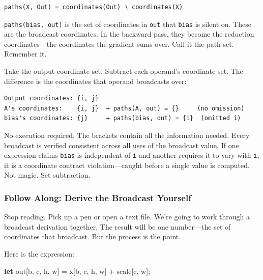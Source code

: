 \documentclass[11pt,titlepage]{article}
\newenvironment{Shaded}{}{}
\newcommand{\KeywordTok}[1]{\textcolor[rgb]{0.00,0.44,0.13}{\textbf{#1}}}
\newcommand{\NormalTok}[1]{#1}
\newcommand{\OperatorTok}[1]{\textcolor[rgb]{0.40,0.40,0.40}{#1}}
\begin{document}
\begin{verbatim}
paths(X, Out) = coordinates(Out) ∖ coordinates(X)
\end{verbatim}

\texttt{paths(bias,\ out)} is the set of coordinates in \texttt{out}
that \texttt{bias} is silent on. These are the broadcast coordinates. In
the backward pass, they become the reduction coordinates---the
coordinates the gradient sums over. Call it the path set. Remember it.

Take the output coordinate set. Subtract each operand's coordinate set.
The difference is the coordinates that operand broadcasts over:

\begin{verbatim}
Output coordinates: {i, j}
A's coordinates:    {i, j}  → paths(A, out) = {}     (no omission)
bias's coordinates: {j}     → paths(bias, out) = {i}  (omitted i)
\end{verbatim}

No execution required. The brackets contain all the information needed.
Every broadcast is verified consistent across all uses of the broadcast
value. If one expression claims \texttt{bias} is independent of
\texttt{i} and another requires it to vary with \texttt{i}, it is a
coordinate contract violation---caught before a single value is
computed. Not magic. Set subtraction.

\vspace{2em}

\hypertarget{follow-along-derive-the-broadcast-yourself}{%
\subsubsection{Follow Along: Derive the Broadcast
Yourself}\label{follow-along-derive-the-broadcast-yourself}}

Stop reading. Pick up a pen or open a text file. We're going to work
through a broadcast derivation together. The result will be one
number---the set of coordinates that broadcast. But the process is the
point.

Here is the expression:

\begin{Shaded}
\begin{Highlighting}[]
\KeywordTok{let}\NormalTok{ out}\OperatorTok{[}\NormalTok{b, c, h, w}\OperatorTok{]}\NormalTok{ = x}\OperatorTok{[}\NormalTok{b, c, h, w}\OperatorTok{]}\NormalTok{ + scale}\OperatorTok{[}\NormalTok{c, w}\OperatorTok{]}\NormalTok{;}
\end{Highlighting}
\end{Shaded}
\end{document}
